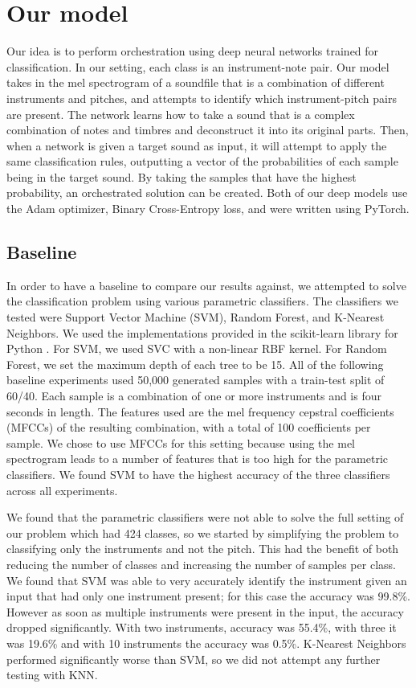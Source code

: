 \documentclass{article}
\begin{document}
\section{Our model}

Our idea is to perform orchestration using deep neural networks trained for classification. In our setting, each class is an instrument-note pair. Our model takes in the mel spectrogram of a soundfile that is a combination of different instruments and pitches, and attempts to identify which instrument-pitch pairs are present. The network learns how to take a sound that is a complex combination of notes and timbres and deconstruct it into its original parts. Then, when a network is given a target sound as input, it will attempt to apply the same classification rules, outputting a vector of the probabilities of each sample being in the target sound. By taking the samples that have the highest probability, an orchestrated solution can be created. Both of our deep models use the Adam optimizer, Binary Cross-Entropy loss, and were written using PyTorch.

\subsection{Baseline}
In order to have a baseline to compare our results against, we attempted to solve the classification problem using various parametric classifiers. The classifiers we tested were Support Vector Machine (SVM), Random Forest, and K-Nearest Neighbors. We used the implementations provided in the scikit-learn library for Python \cite{scikit-learn}. For SVM, we used SVC with a non-linear RBF kernel. For Random Forest, we set the maximum depth of each tree to be 15.  All of the following baseline experiments used 50,000 generated samples with a train-test split of 60/40. Each sample is a combination of one or more instruments and is four seconds in length. The features used are the mel frequency cepstral coefficients (MFCCs) of the resulting combination, with a total of 100 coefficients per sample. We chose to use MFCCs for this setting because using the mel spectrogram leads to a number of features that is too high for the parametric classifiers. We found SVM to have the highest accuracy of the three classifiers across all experiments.

We found that the parametric classifiers were not able to solve the full setting of our problem which had 424 classes, so we started by simplifying the problem to classifying only the instruments and not the pitch. This had the benefit of both reducing the number of classes and increasing the number of samples per class. We found that SVM was able to very accurately identify the instrument given an input that had only one instrument present; for this case the accuracy was 99.8\%. However as soon as multiple instruments were present in the input, the accuracy dropped significantly. With two instruments, accuracy was 55.4\%, with three it was 19.6\% and with 10 instruments the accuracy was 0.5\%. K-Nearest Neighbors performed significantly worse than SVM, so we did not attempt any further testing with KNN.
\end{document}
